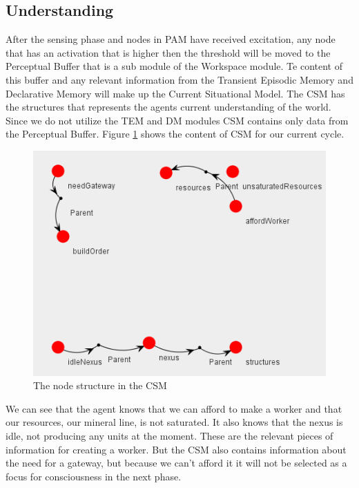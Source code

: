 \subsection{Understanding}
After the sensing phase and nodes in PAM have received excitation, any node that has an activation that is higher then the threshold will be moved to the Perceptual Buffer that is a sub module of the Workspace module. Te content of this buffer and any relevant information from the Transient Episodic Memory and Declarative Memory will make up the Current Situational Model. The CSM has the structures that represents the agents current understanding of the world. Since we do not utilize the TEM and DM modules CSM contains only data from the Perceptual Buffer. Figure \ref{fig:csm} shows the content of CSM for our current cycle. 

\begin{figure}[h!tb]
\centering
\includegraphics[scale=1.0]{graphics/perceptual_buffer.png}
\caption{The node structure in the CSM}
\label{fig:csm}
\end{figure}

We can see that the agent knows that we can afford to make a worker and that our resources, our mineral line, is not saturated. It also knows that the nexus is idle, not producing any units at the moment. These are the relevant pieces of information for creating a worker. But the CSM also contains information about the need for a gateway, but because we can't afford it it will not be selected as a focus for consciousness in the next phase.


